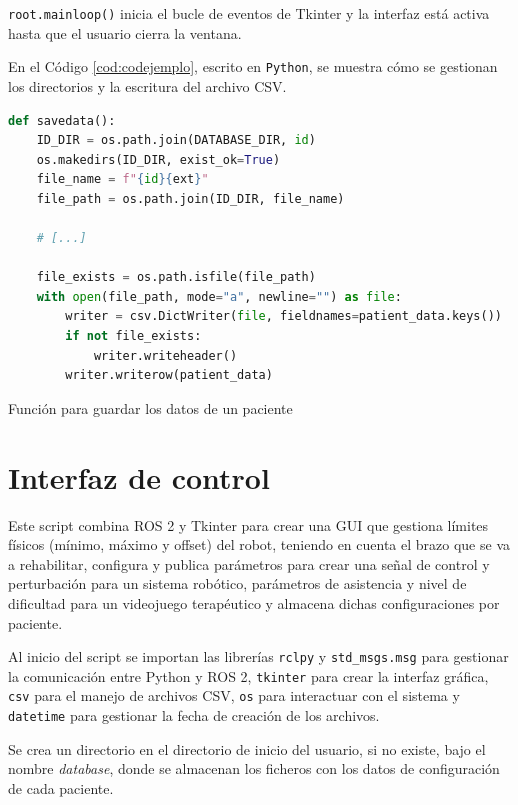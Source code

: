 \verb|root.mainloop()| inicia el bucle de eventos de Tkinter y la interfaz está activa hasta que el usuario cierra la ventana.

En el Código \ref{cod:codejemplo}, escrito en \texttt{Python}, se muestra cómo se gestionan los directorios y la escritura del archivo CSV.

\begin{code}[h]
\begin{lstlisting}[language=Python]
def savedata():
    ID_DIR = os.path.join(DATABASE_DIR, id)
    os.makedirs(ID_DIR, exist_ok=True)
    file_name = f"{id}{ext}"
    file_path = os.path.join(ID_DIR, file_name)

    # [...]

    file_exists = os.path.isfile(file_path)
    with open(file_path, mode="a", newline="") as file:
        writer = csv.DictWriter(file, fieldnames=patient_data.keys())
        if not file_exists:
            writer.writeheader()
        writer.writerow(patient_data)
\end{lstlisting}
\caption[Función para guardar los datos de un paciente]{Función para guardar los datos de un paciente}
\label{cod:codejemplo}
\end{code}

\section{Interfaz de control}
\label{section:controller}

Este script combina ROS 2 y Tkinter para crear una GUI que gestiona límites físicos (mínimo, máximo y offset) del robot, teniendo en cuenta el brazo que se va a rehabilitar, configura y publica parámetros para crear una señal de control y perturbación para un sistema robótico, parámetros de asistencia y nivel de dificultad para un videojuego terapéutico y almacena dichas configuraciones por paciente.

Al inicio del script se importan las librerías \verb|rclpy| y \verb|std_msgs.msg| para gestionar la comunicación entre Python y ROS 2, \verb|tkinter| para crear la interfaz gráfica, \verb|csv| para el manejo de archivos CSV, \verb|os| para interactuar con el sistema y \verb|datetime| para gestionar la fecha de creación de los archivos.

Se crea un directorio en el directorio de inicio del usuario, si no existe, bajo el nombre \textit{database}, donde se almacenan los ficheros con los datos de configuración de cada paciente.

